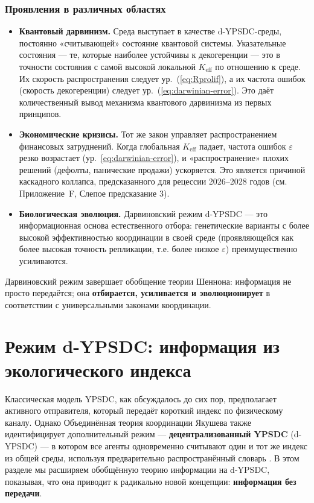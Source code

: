 \documentclass[12pt,a4paper]{article}
\theoremstyle{remark}
\begin{document}
	\subsubsection*{Проявления в различных областях}
	\begin{itemize}[leftmargin=*]
		\item \textbf{Квантовый дарвинизм.} Среда выступает в качестве d-YPSDC-среды, постоянно «считывающей» состояние квантовой системы. Указательные состояния — те, которые наиболее устойчивы к декогеренции — это в точности состояния с самой высокой локальной $K_{\mathrm{eff}}$ по отношению к среде. Их скорость распространения следует ур.~(\ref{eq:Rprolif}), а их частота ошибок (скорость декогеренции) следует ур.~(\ref{eq:darwinian-error}). Это даёт количественный вывод механизма квантового дарвинизма из первых принципов.
		\item \textbf{Экономические кризисы.} Тот же закон управляет распространением финансовых затруднений. Когда глобальная $K_{\mathrm{eff}}$ падает, частота ошибок $\varepsilon$ резко возрастает (ур.~\ref{eq:darwinian-error}), и «распространение» плохих решений (дефолты, панические продажи) ускоряется. Это является причиной каскадного коллапса, предсказанного для рецессии 2026–2028 годов (см. Приложение~F, Слепое предсказание 3).
		\item \textbf{Биологическая эволюция.} Дарвиновский режим d-YPSDC — это информационная основа естественного отбора: генетические варианты с более высокой эффективностью координации в своей среде (проявляющейся как более высокая точность репликации, т.е. более низкое $\varepsilon$) преимущественно усиливаются.
	\end{itemize}
	
	Дарвиновский режим завершает обобщение теории Шеннона: информация не просто передаётся; она \textbf{отбирается, усиливается и эволюционирует} в соответствии с универсальными законами координации.
	
	\section{Режим d-YPSDC: информация из экологического индекса}
	\label{sec:d-ypsdc-info}
	
	Классическая модель YPSDC, как обсуждалось до сих пор, предполагает активного отправителя, который передаёт короткий индекс по физическому каналу. Однако Объединённая теория координации Якушева также идентифицирует дополнительный режим — \textbf{децентрализованный YPSDC} (d-YPSDC) — в котором все агенты одновременно считывают один и тот же индекс из общей среды, используя предварительно распространённый словарь \cite{Appendix_dYPSDC}. В этом разделе мы расширяем обобщённую теорию информации на d-YPSDC, показывая, что она приводит к радикально новой концепции: \textbf{информация без передачи}.
	
\end{document}
